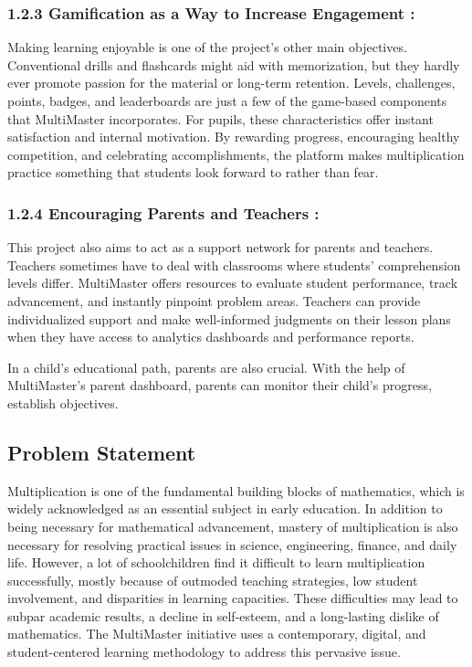 \documentclass[BTech]{audiss}
\begin{document}
\subsubsection{1.2.3 Gamification as a Way to Increase Engagement :}
Making learning enjoyable is one of the project's other main objectives. Conventional drills and flashcards might aid with memorization, but they hardly ever promote passion for the material or long-term retention. Levels, challenges, points, badges, and leaderboards are just a few of the game-based components that MultiMaster incorporates. For pupils, these characteristics offer instant satisfaction and internal motivation. By rewarding progress, encouraging healthy competition, and celebrating accomplishments, the platform makes multiplication practice something that students look forward to rather than fear.

\subsubsection{1.2.4 Encouraging Parents and Teachers :}
This project also aims to act as a support network for parents and teachers. Teachers sometimes have to deal with classrooms where students' comprehension levels differ. MultiMaster offers resources to evaluate student performance, track advancement, and instantly pinpoint problem areas. Teachers can provide individualized support and make well-informed judgments on their lesson plans when they have access to analytics dashboards and performance reports. 

In a child's educational path, parents are also crucial. With the help of MultiMaster's parent dashboard, parents can monitor their child's progress, establish objectives.

\subsection{Problem Statement}
Multiplication is one of the fundamental building blocks of mathematics, which is widely acknowledged as an essential subject in early education. In addition to being necessary for mathematical advancement, mastery of multiplication is also necessary for resolving practical issues in science, engineering, finance, and daily life. However, a lot of schoolchildren find it difficult to learn multiplication successfully, mostly because of outmoded teaching strategies, low student involvement, and disparities in learning capacities. These difficulties may lead to subpar academic results, a decline in self-esteem, and a long-lasting dislike of mathematics. The MultiMaster initiative uses a contemporary, digital, and student-centered learning methodology to address this pervasive issue.
\end{document}
